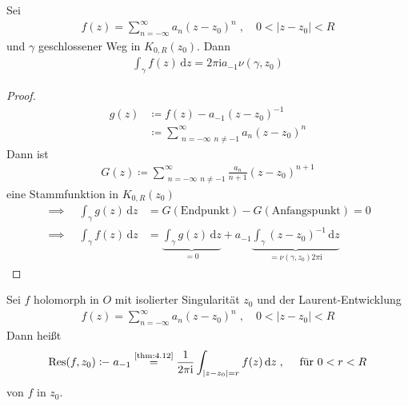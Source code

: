\begin{theorem}[Satz] \label{thm:4.12}
  Sei
  \begin{align*}
    f(z) = \sum\limits_{n = -\infty}^{\infty} a_n (z-z_0)^n \; , \quad 0 < |z-z_0| < R
  \end{align*}
  und $\gamma$ geschlossener Weg in $K_{0,R}(z_0)$. Dann
  \begin{align*}
    \int_{\gamma} f(z) \, \mathrm{d}z = 2 \pi \mathrm{i} a_{-1} \nu(\gamma,z_0)
  \end{align*}
  
  \begin{proof}
    \begin{align*}
      g(z)
      &\coloneq f(z) - a_{-1} (z-z_0)^{-1} \\
      &\coloneq \sum\limits_{\substack{n=-\infty}{n \neq -1}}^{\infty} a_n (z-z_0)^n
    \end{align*}
    Dann ist
    \begin{align*}
      G(z) \coloneq \sum\limits_{\substack{n=-\infty}{n \neq -1}}^{\infty} \frac{a_n}{n+1} (z-z_0)^{n+1}
    \end{align*}
    eine Stammfunktion in $K_{0,R}(z_0)$
    \begin{align*}
      \implies \quad \int_\gamma g(z) \, \mathrm{d}z &= G(\text{Endpunkt}) - G(\text{Anfangspunkt}) = 0 \\
      \implies \quad \int_\gamma f(z) \, \mathrm{d}z &= \underbrace{\int_\gamma g(z) \, \mathrm{d}z}_{=0} + a_{-1} \underbrace{\int_\gamma (z-z_0)^{-1} \, \mathrm{d}z}_{= \nu(\gamma,z_0) 2 \pi \mathrm{i}}
    \end{align*}
  \end{proof}
\end{theorem}

\begin{theorem}[Definition]
  Sei $f$ holomorph in $O$ mit isolierter Singularität $z_0$ und der Laurent-Entwicklung
  \begin{align*}
    f(z) = \sum\limits_{n = -\infty}^{\infty} a_n (z-z_0)^n \; , \quad 0 < |z-z_0| < R
  \end{align*}
  Dann heißt
  \begin{align*}
    \mathrm{Res}(f,z_0) \coloneq a_{-1} \overset{\text{\ref{thm:4.12}}}{=} \frac{1}{2 \pi \mathrm{i}} \int_{|z-z_0|=r} f(z) \, \mathrm{d}z \; , \quad \text{ für } 0 < r < R
  \end{align*}
   von $f$ in $z_0$.
\end{theorem}

